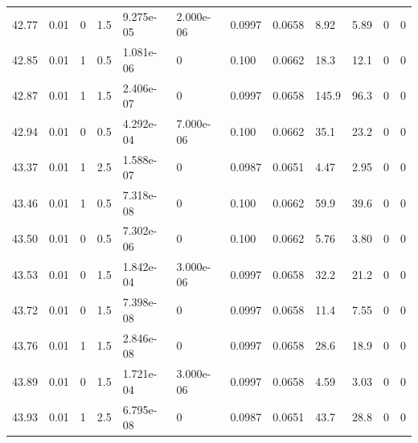 \documentclass[preview]{standalone}
\begin{document}
{{{{{{{{{\begin{tabular}{L{1.2cm}C{1.2cm} C{0.3cm}C{0.5cm} C{1.4cm}C{1.4cm} C{1.4cm}C{1.4cm} C{1.6cm}C{1.6cm} C{1.6cm}C{1.6cm}}
  42.77  &  0.01  & 0     & 1.5 &  9.275e-05  & 2.000e-06  &  0.0997&   0.0658& 8.92 & 5.89   &  0 & 0  \\ 
  42.85  &  0.01  & 1     & 0.5 &  1.081e-06  & 0  &  0.100&   0.0662& 18.3 & 12.1   &  0 & 0  \\ 
  42.87  &  0.01  & 1     & 1.5 &  2.406e-07  & 0  &  0.0997&   0.0658& 145.9 & 96.3   &  0 & 0  \\ 
  42.94  &  0.01  & 0     & 0.5 &  4.292e-04  & 7.000e-06  &  0.100&   0.0662& 35.1 & 23.2   &  0 & 0  \\ 
  43.37  &  0.01  & 1     & 2.5 &  1.588e-07  & 0  &  0.0987&   0.0651& 4.47 & 2.95   &  0 & 0  \\ 
  43.46  &  0.01  & 1     & 0.5 &  7.318e-08  & 0  &  0.100&   0.0662& 59.9 & 39.6   &  0 & 0  \\ 
  43.50  &  0.01  & 0     & 0.5 &  7.302e-06  & 0  &  0.100&   0.0662& 5.76 & 3.80   &  0 & 0  \\ 
  43.53  &  0.01  & 0     & 1.5 &  1.842e-04  & 3.000e-06  &  0.0997&   0.0658& 32.2 & 21.2   &  0 & 0  \\ 
  43.72  &  0.01  & 0     & 1.5 &  7.398e-08  & 0  &  0.0997&   0.0658& 11.4 & 7.55   &  0 & 0  \\ 
  43.76  &  0.01  & 1     & 1.5 &  2.846e-08  & 0  &  0.0997&   0.0658& 28.6 & 18.9   &  0 & 0  \\ 
  43.89  &  0.01  & 0     & 1.5 &  1.721e-04  & 3.000e-06  &  0.0997&   0.0658& 4.59 & 3.03   &  0 & 0  \\ 
  43.93  &  0.01  & 1     & 2.5 &  6.795e-08  & 0  &  0.0987&   0.0651& 43.7 & 28.8   &  0 & 0  \\ 
\hline 
\end{tabular} 

}}}}}}}}}
\end{document}
